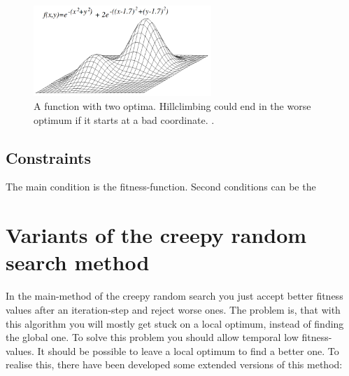 \documentclass[10pt,a4paper,DIV=11]{scrreprt}
\begin{document}
\begin{center}
	\begin{figure}[H]
		\centering
		\includegraphics[width=0.6\textwidth,scale=1]{files/Local_maximum.png}  
		\caption{A function with two optima. Hillclimbing could end in the worse optimum if it starts at a bad coordinate. \cite{wiki-hill}.}
		\label{fig:hill2}
	\end{figure}
\end{center}


\subsection{Constraints} %
The main condition is the fitness-function. Second conditions
can be the


\section{Variants of the creepy random search method}
In the main-method of the creepy random search you just accept better fitness values after an iteration-step and reject worse ones.
The problem is, that with this algorithm you will mostly get stuck on a local optimum, instead of finding the global one.
To solve this problem you should allow temporal low fitness-values. It should be possible to leave a local optimum to find a better one.
To realise this, there have been developed some extended versions of this method: \\

 \\
\end{document}
